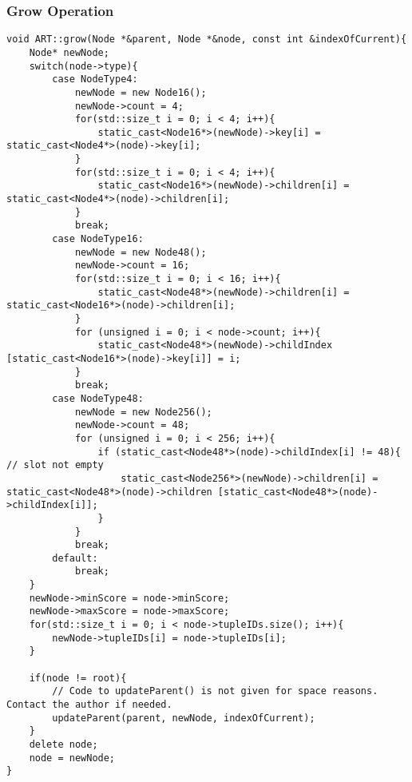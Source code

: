\subsubsection{{\large Grow Operation}}
\begin{verbatim}
void ART::grow(Node *&parent, Node *&node, const int &indexOfCurrent){
	Node* newNode;
	switch(node->type){
		case NodeType4:
			newNode = new Node16();
			newNode->count = 4;
			for(std::size_t i = 0; i < 4; i++){
				static_cast<Node16*>(newNode)->key[i] = static_cast<Node4*>(node)->key[i];
			}
			for(std::size_t i = 0; i < 4; i++){
				static_cast<Node16*>(newNode)->children[i] = static_cast<Node4*>(node)->children[i];
			}
			break;
		case NodeType16:
			newNode = new Node48();
			newNode->count = 16;
			for(std::size_t i = 0; i < 16; i++){
				static_cast<Node48*>(newNode)->children[i] = static_cast<Node16*>(node)->children[i];
			}
			for (unsigned i = 0; i < node->count; i++){
				static_cast<Node48*>(newNode)->childIndex [static_cast<Node16*>(node)->key[i]] = i;
			}
			break;
		case NodeType48:
			newNode = new Node256();
			newNode->count = 48;
			for (unsigned i = 0; i < 256; i++){
				if (static_cast<Node48*>(node)->childIndex[i] != 48){ // slot not empty
					static_cast<Node256*>(newNode)->children[i] = static_cast<Node48*>(node)->children [static_cast<Node48*>(node)->childIndex[i]];
				}
			}
			break;
		default:
			break;
	}
	newNode->minScore = node->minScore;
	newNode->maxScore = node->maxScore;
	for(std::size_t i = 0; i < node->tupleIDs.size(); i++){
		newNode->tupleIDs[i] = node->tupleIDs[i];
	}
	
	if(node != root){
		// Code to updateParent() is not given for space reasons. Contact the author if needed. 
		updateParent(parent, newNode, indexOfCurrent);
	}
	delete node;
	node = newNode;
}
\end{verbatim}


